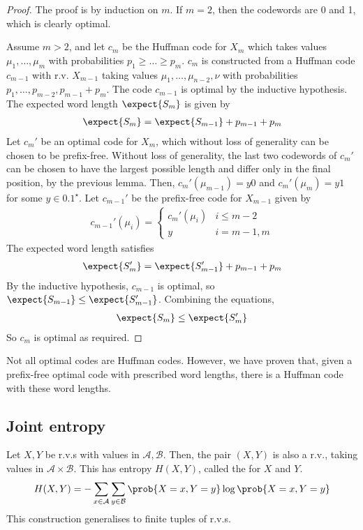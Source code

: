 \begin{proof}
    The proof is by induction on $m$.
    If $m = 2$, then the codewords are 0 and 1, which is clearly optimal.

    Assume $m > 2$, and let $c_m$ be the Huffman code for $X_m$ which takes values $\mu_1, \dots, \mu_m$ with probabilities $p_1 \geq \dots \geq p_m$.
    $c_m$ is constructed from a Huffman code $c_{m-1}$ with r.v. $X_{m-1}$ taking values $\mu_1, \dots, \mu_{n-2}, \nu$ with probabilities $p_1, \dots, p_{m-2}, p_{m-1} + p_m$.
    The code $c_{m-1}$ is optimal by the inductive hypothesis.
    The expected word length $\expect{S_m}$ is given by
    \begin{align*}
        \expect{S_m} = \expect{S_{m-1}} + p_{m-1} + p_m
    \end{align*}
    Let $c_m'$ be an optimal code for $X_m$, which without loss of generality can be chosen to be prefix-free.
    Without loss of generality, the last two codewords of $c_m'$ can be chosen to have the largest possible length and differ only in the final position, by the previous lemma.
    Then, $c_m'(\mu_{m-1}) = y 0$ and $c_m'(\mu_m) = y 1$ for some $y \in \qty{0,1}^\star$.
    Let $c_{m-1}'$ be the prefix-free code for $X_{m-1}$ given by
    \begin{align*}
        c_{m-1}'(\mu_i) = \begin{cases}
        c_m'(\mu_i) & i \leq m-2 \\
        y & i = m-1, m
    \end{cases}
    \end{align*}
    The expected word length satisfies
    \begin{align*}
        \expect{S_m'} = \expect{S_{m-1}'} + p_{m-1} + p_m
    \end{align*}
    By the inductive hypothesis, $c_{m-1}$ is optimal, so $\expect{S_{m-1}} \leq \expect{S_{m-1}'}$.
    Combining the equations,
    \begin{align*}
        \expect{S_m} \leq \expect{S_m'}
    \end{align*}
    So $c_m$ is optimal as required.
\end{proof}

\begin{remark}
    Not all optimal codes are Huffman codes.
    However, we have proven that, given a prefix-free optimal code with prescribed word lengths, there is a Huffman code with these word lengths.
\end{remark}

\subsection{Joint entropy}
Let $X, Y$ be r.v.s with values in $\mathcal A, \mathcal B$.
Then, the pair $(X, Y)$ is also a r.v., taking values in $\mathcal A \times \mathcal B$.
This has entropy $H(X,Y)$, called the  for $X$ and $Y$.
\begin{align*}
    H(X,Y) = - \sum_{x \in \mathcal A} \sum_{y \in \mathcal B} \prob{X = x, Y = y} \log \prob{X = x, Y = y}
\end{align*}
This construction generalises to finite tuples of r.v.s.

